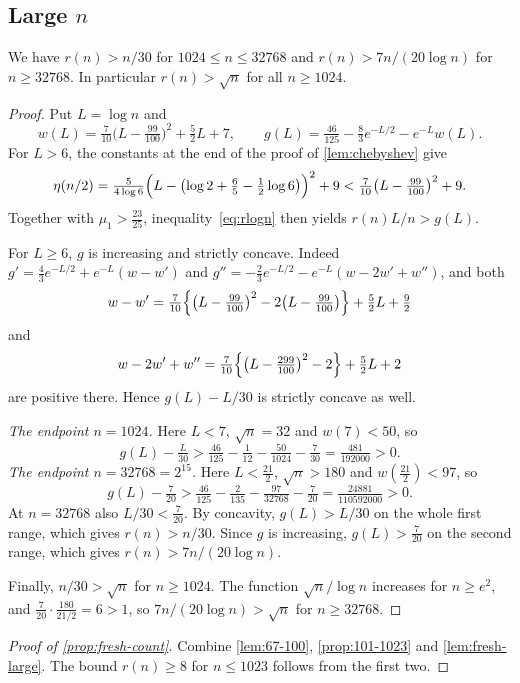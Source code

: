 \subsection{Large \texorpdfstring{$n$}{n}}

\begin{lemma}\label{lem:fresh-large}
We have $r(n)>n/30$ for $1024\le n\le32768$ and $r(n)>7n/(20\log n)$ for $n\ge32768$. In particular $r(n)>\sqrt n$ for all $n\ge1024$.
\end{lemma}

\begin{proof}
Put $L=\log n$ and
\[
 w(L)=\tfrac7{10}\bigl(L-\tfrac{99}{100}\bigr)^2+\tfrac52L+7,\qquad
 g(L)=\tfrac{46}{125}-\tfrac83e^{-L/2}-e^{-L}w(L).
\]
For $L>6$, the constants at the end of the proof of \cref{lem:chebyshev} give
\[
 \eta(n/2)=\tfrac5{4\log6}\Bigl(L-\bigl(\log2+\tfrac65-\tfrac12\log6\bigr)\Bigr)^2+9<\tfrac7{10}\bigl(L-\tfrac{99}{100}\bigr)^2+9 .
\]
Together with $\mu_1>\frac{23}{25}$, inequality~\eqref{eq:rlogn} then yields $r(n)L/n>g(L)$.

For $L\ge6$, $g$ is increasing and strictly concave. Indeed $g'=\frac43e^{-L/2}+e^{-L}(w-w')$ and $g''=-\frac23e^{-L/2}-e^{-L}(w-2w'+w'')$, and both
\[
 w-w'=\tfrac7{10}\Bigl\{\bigl(L-\tfrac{99}{100}\bigr)^2-2\bigl(L-\tfrac{99}{100}\bigr)\Bigr\}+\tfrac52L+\tfrac92
\]
and
\[
 w-2w'+w''=\tfrac7{10}\Bigl\{\bigl(L-\tfrac{299}{100}\bigr)^2-2\Bigr\}+\tfrac52L+2
\]
are positive there. Hence $g(L)-L/30$ is strictly concave as well.

\emph{The endpoint $n=1024$.} Here $L<7$, $\sqrt n=32$ and $w(7)<50$, so
\[
 g(L)-\tfrac L{30}>\tfrac{46}{125}-\tfrac1{12}-\tfrac{50}{1024}-\tfrac7{30}=\tfrac{481}{192000}>0 .
\]
\emph{The endpoint $n=32768=2^{15}$.} Here $L<\frac{21}2$, $\sqrt n>180$ and $w(\frac{21}2)<97$, so
\[
 g(L)-\tfrac7{20}>\tfrac{46}{125}-\tfrac2{135}-\tfrac{97}{32768}-\tfrac7{20}=\tfrac{24881}{110592000}>0 .
\]
At $n=32768$ also $L/30<\frac7{20}$. By concavity, $g(L)>L/30$ on the whole first range, which gives $r(n)>n/30$. Since $g$ is increasing, $g(L)>\frac7{20}$ on the second range, which gives $r(n)>7n/(20\log n)$.

Finally, $n/30>\sqrt n$ for $n\ge1024$. The function $\sqrt n/\log n$ increases for $n\ge e^2$, and $\frac7{20}\cdot\frac{180}{21/2}=6>1$, so $7n/(20\log n)>\sqrt n$ for $n\ge32768$.
\end{proof}

\begin{proof}[Proof of \cref{prop:fresh-count}]
Combine \cref{lem:67-100}, \cref{prop:101-1023} and \cref{lem:fresh-large}. The bound $r(n)\ge8$ for $n\le1023$ follows from the first two.
\end{proof}
